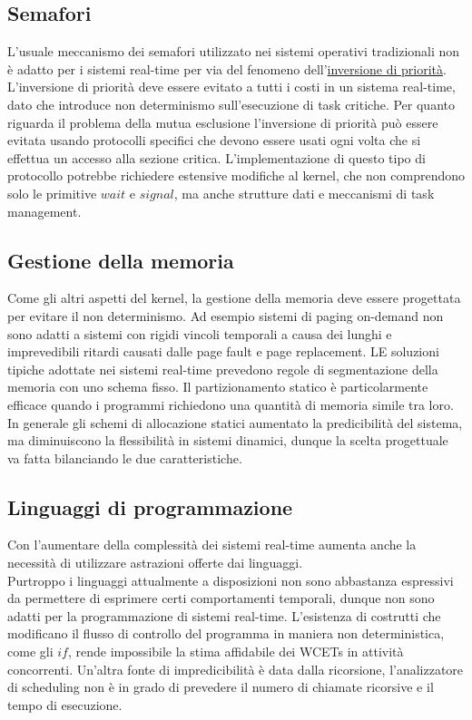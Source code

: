 \documentclass[12pt]{article}
\begin{document}
\subsection{Semafori}
L'usuale meccanismo dei semafori utilizzato nei sistemi operativi tradizionali non è adatto per i sistemi real-time per via del fenomeno dell'\href{https://en.wikipedia.org/wiki/Priority_inversion}{inversione di priorità}.
L'inversione di priorità deve essere evitato a tutti i costi in un sistema real-time, dato che introduce non determinismo sull'esecuzione di task critiche.
Per quanto riguarda il problema della mutua esclusione l'inversione di priorità può essere evitata usando protocolli specifici che devono essere usati ogni 
volta che si effettua un accesso alla sezione critica.
L'implementazione di questo tipo di protocollo potrebbe richiedere estensive modifiche al kernel, che non comprendono solo le primitive $wait$ e $signal$, ma anche strutture dati e meccanismi di task management.
\subsection{Gestione della memoria}
Come gli altri aspetti del kernel, la gestione della memoria deve essere progettata per evitare il non determinismo.
Ad esempio sistemi di paging on-demand non sono adatti a sistemi con rigidi vincoli temporali a causa dei lunghi e imprevedibili ritardi causati dalle page fault e page replacement.
LE soluzioni tipiche adottate nei sistemi real-time prevedono regole di segmentazione della memoria con uno schema fisso. Il partizionamento statico è particolarmente efficace quando i programmi richiedono
una quantità di memoria simile tra loro.
In generale gli schemi di allocazione statici aumentato la predicibilità del sistema, ma diminuiscono la flessibilità in sistemi dinamici, dunque la scelta progettuale va fatta bilanciando le due caratteristiche.
\subsection{Linguaggi di programmazione}
Con l'aumentare della complessità dei sistemi real-time aumenta anche la necessità di utilizzare astrazioni offerte dai linguaggi.
\\
Purtroppo i linguaggi attualmente a disposizioni non sono abbastanza espressivi da permettere di esprimere certi comportamenti temporali, dunque non sono adatti per la programmazione di sistemi real-time.
L'esistenza di costrutti che modificano il flusso di controllo del programma in maniera non deterministica, come gli $if$, rende impossibile la stima affidabile dei WCETs in attività concorrenti.
Un'altra fonte di impredicibilità è data dalla ricorsione, l'analizzatore di scheduling non è in grado di prevedere il numero di chiamate ricorsive e il tempo di esecuzione.
\end{document}
